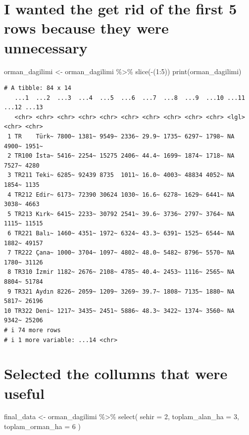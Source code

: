 \documentclass[
  11pt,
  a4paper,
  DIV=11,
  numbers=noendperiod]{scrartcl}
\newenvironment{Shaded}{\begin{snugshade}}{\end{snugshade}}
\newcommand{\AttributeTok}[1]{\textcolor[rgb]{0.40,0.45,0.13}{#1}}
\newcommand{\DecValTok}[1]{\textcolor[rgb]{0.68,0.00,0.00}{#1}}
\newcommand{\FunctionTok}[1]{\textcolor[rgb]{0.28,0.35,0.67}{#1}}
\newcommand{\NormalTok}[1]{\textcolor[rgb]{0.00,0.23,0.31}{#1}}
\newcommand{\OtherTok}[1]{\textcolor[rgb]{0.00,0.23,0.31}{#1}}
\newcommand{\SpecialCharTok}[1]{\textcolor[rgb]{0.37,0.37,0.37}{#1}}
\begin{document}
\section{I wanted the get rid of the first 5 rows because they were
unnecessary}\label{i-wanted-the-get-rid-of-the-first-5-rows-because-they-were-unnecessary}

\begin{Shaded}
\begin{Highlighting}[]
\NormalTok{orman\_dagilimi }\OtherTok{\textless{}{-}}\NormalTok{ orman\_dagilimi }\SpecialCharTok{\%\textgreater{}\%} 
  \FunctionTok{slice}\NormalTok{(}\SpecialCharTok{{-}}\NormalTok{(}\DecValTok{1}\SpecialCharTok{:}\DecValTok{5}\NormalTok{))}
\FunctionTok{print}\NormalTok{(orman\_dagilimi)}
\end{Highlighting}
\end{Shaded}

\begin{verbatim}
# A tibble: 84 x 14
   ...1  ...2  ...3  ...4  ...5  ...6  ...7  ...8  ...9  ...10 ...11 ...12 ...13
   <chr> <chr> <chr> <chr> <chr> <chr> <chr> <chr> <chr> <chr> <lgl> <chr> <chr>
 1 TR    Türk~ 7800~ 1381~ 9549~ 2336~ 29.9~ 1735~ 6297~ 1798~ NA    4900~ 1951~
 2 TR100 İsta~ 5416~ 2254~ 15275 2406~ 44.4~ 1699~ 1874~ 1718~ NA    7527~ 4280 
 3 TR211 Teki~ 6285~ 92439 8735  1011~ 16.0~ 4003~ 48834 4052~ NA    1854~ 1135 
 4 TR212 Edir~ 6173~ 72390 30624 1030~ 16.6~ 6278~ 1629~ 6441~ NA    3038~ 4663 
 5 TR213 Kırk~ 6415~ 2233~ 30792 2541~ 39.6~ 3736~ 2797~ 3764~ NA    1115~ 11515
 6 TR221 Balı~ 1460~ 4351~ 1972~ 6324~ 43.3~ 6391~ 1525~ 6544~ NA    1882~ 49157
 7 TR222 Çana~ 1000~ 3704~ 1097~ 4802~ 48.0~ 5482~ 8796~ 5570~ NA    1780~ 31126
 8 TR310 İzmir 1182~ 2676~ 2108~ 4785~ 40.4~ 2453~ 1116~ 2565~ NA    8804~ 51784
 9 TR321 Aydın 8226~ 2059~ 1209~ 3269~ 39.7~ 1808~ 7135~ 1880~ NA    5817~ 26196
10 TR322 Deni~ 1217~ 3435~ 2451~ 5886~ 48.3~ 3422~ 1374~ 3560~ NA    9342~ 25206
# i 74 more rows
# i 1 more variable: ...14 <chr>
\end{verbatim}

\section{Selected the collumns that were
useful}\label{selected-the-collumns-that-were-useful}

\begin{Shaded}
\begin{Highlighting}[]
\NormalTok{final\_data }\OtherTok{\textless{}{-}}\NormalTok{ orman\_dagilimi }\SpecialCharTok{\%\textgreater{}\%}
  \FunctionTok{select}\NormalTok{(}
    \AttributeTok{sehir =} \DecValTok{2}\NormalTok{, }
    \AttributeTok{toplam\_alan\_ha =} \DecValTok{3}\NormalTok{, }
    \AttributeTok{toplam\_orman\_ha =} \DecValTok{6}
\NormalTok{  )}
\end{Highlighting}
\end{Shaded}
\end{document}
